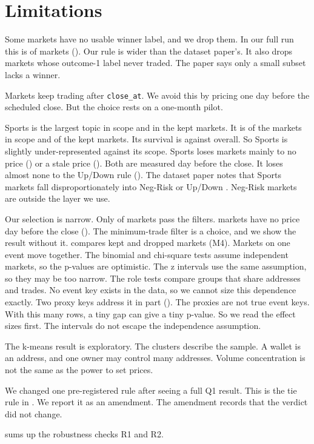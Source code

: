 \section{Limitations}\label{sec:limits}
Some markets have no usable winner label, and we drop them.
In our full run this is \NNoOutcome{} of \NMarketsInScope{} markets (\PctNoOutcome).
Our rule is wider than the dataset paper's.
It also drops markets whose outcome-1 label never traded.
The paper says only a small subset lacks a winner.

Markets keep trading after \texttt{close\_at}.
We avoid this by pricing one day before the scheduled close.
But the choice rests on a one-month pilot.

Sports is the largest topic in scope and in the kept markets.
It is \SportsShareInScope{} of the \NMarketsInScope{} markets in scope and \SportsShareKept{} of the kept markets.
Its survival is \CatSportsSurvival{} against \PctKept{} overall.
So Sports is slightly under-represented against its scope.
Sports loses markets mainly to no price (\CatSportsDropNoPriceN) or a stale price (\CatSportsDropStalePriceN).
Both are measured \DaysShort{} day before the close.
It loses almost none to the Up/Down rule (\CatSportsDropUpdownN).
The dataset paper notes that Sports markets fall disproportionately into Neg-Risk or Up/Down \citep{qin2026polymarketv1}.
Neg-Risk markets are outside the layer we use.

Our selection is narrow.
Only \NMarketsKept{} of \NMarketsInScope{} markets pass the filters.
\NNoPrice{} markets have no price \DaysShort{} day before the close (\PctNoPrice).
The minimum-trade filter is a choice, and we show the result without it.
 compares kept and dropped markets (M4).
Markets on one event move together.
The binomial and chi-square tests assume independent markets, so the p-values are optimistic.
The z intervals use the same assumption, so they may be too narrow.
The role tests compare groups that share addresses and trades.
No event key exists in the data, so we cannot size this dependence exactly.
Two proxy keys address it in part ().
The proxies are not true event keys.
With this many rows, a tiny gap can give a tiny p-value.
So we read the effect sizes first.
The intervals do not escape the independence assumption.

The k-means result is exploratory.
The clusters describe the sample.
A wallet is an address, and one owner may control many addresses.
Volume concentration is not the same as the power to set prices.

We changed one pre-registered rule after seeing a full Q1 result.
This is the tie rule in .
We report it as an amendment.
The amendment records that the verdict did not change.

 sums up the robustness checks R1 and R2.
